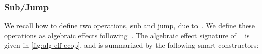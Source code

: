 \subsubsection{Sub/Jump}
We recall how to define two operations, sub and jump, due to~\citet{thielecke1997phd,DBLP:conf/csl/FioreS14}.
We define these operations as algebraic effects following~\citet{SchrijversPWJ19}.
The algebraic effect signature of ~ is given in \cref{fig:alg-eff-ccop}, and is summarized by the following smart constructors:
%
\begin{code}[hide]%
%
\>[4]\AgdaSpace{}%
\AgdaSpace{}%
\AgdaSpace{}%
\AgdaSpace{}%
\AgdaSymbol{:}\AgdaSpace{}%
\AgdaSpace{}%
\AgdaSpace{}%
\AgdaSymbol{(}\AgdaSpace{}%
\AgdaSymbol{:}\AgdaSpace{}%
\AgdaSpace{}%
\AgdaSpace{}%
\AgdaSymbol{)}\AgdaSpace{}%
\AgdaSymbol{:}\AgdaSpace{}%
\AgdaSpace{}%
\<%
\\
\>[4][@{}l@{\AgdaIndent{0}}]%
\>[6]%
\>[12]\AgdaSymbol{:}\AgdaSpace{}%
\AgdaSymbol{\{}\AgdaSpace{}%
\AgdaSymbol{:}\AgdaSpace{}%
\AgdaSymbol{\}}%
\>[51]%
\>[54]\AgdaSpace{}%
\<%
\\
%
\>[6]%
\>[12]\AgdaSymbol{:}\AgdaSpace{}%
\AgdaSymbol{\{}\AgdaSpace{}%
\AgdaSymbol{:}\AgdaSpace{}%
\AgdaSymbol{\}}\AgdaSpace{}%
\AgdaSymbol{(}\AgdaSpace{}%
\AgdaSymbol{:}\AgdaSpace{}%
\AgdaSpace{}%
\AgdaSymbol{)}\AgdaSpace{}%
\AgdaSymbol{(}\AgdaSpace{}%
\AgdaSymbol{:}\AgdaSpace{}%
\AgdaSpace{}%
\AgdaSpace{}%
\AgdaSymbol{)}\AgdaSpace{}%
%
\>[55]\AgdaSpace{}%
\<%
\\
%
\\[\AgdaEmptyExtraSkip]%
%
\>[4]\AgdaSpace{}%
\AgdaSymbol{:}\AgdaSpace{}%
\AgdaSpace{}%
\AgdaSpace{}%
\AgdaSymbol{:}\AgdaSpace{}%
\AgdaSpace{}%
\AgdaSpace{}%
\AgdaSymbol{(}\AgdaSpace{}%
\AgdaSymbol{:}\AgdaSpace{}%
\AgdaSpace{}%
\AgdaSpace{}%
\AgdaSymbol{)}\AgdaSpace{}%
\AgdaSpace{}%
\<%
\\

\end{code}
